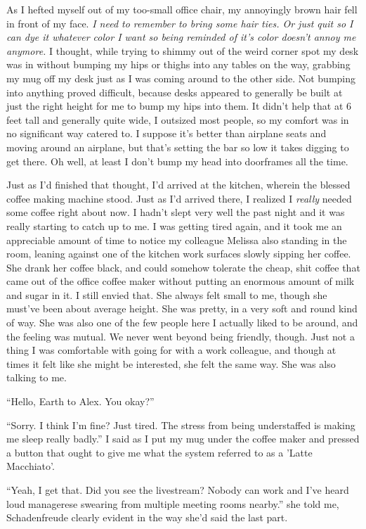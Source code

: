 As I hefted myself out of my too-small office chair, my annoyingly brown hair
fell in front of my face. \textit{I need to remember to bring some hair ties. Or
just quit so I can dye it whatever color I want so being reminded of it's color
doesn't annoy me anymore.} I thought, while trying to shimmy out of the weird
corner spot my desk was in without bumping my hips or thighs into any tables on
the way, grabbing my mug off my desk just as I was coming around to the other
side. Not bumping into anything proved difficult, because desks appeared to
generally be built at just the right height for me to bump my hips into them. It
didn't help that at 6 feet tall and generally quite wide, I outsized most
people, so my comfort was in no significant way catered to. I suppose it's
better than airplane seats and moving around an airplane, but that's setting the
bar so low it takes digging to get there. Oh well, at least I don't bump my head
into doorframes all the time.

Just as I'd finished that thought, I'd arrived at the kitchen, wherein the
blessed coffee making machine stood. Just as I'd arrived there, I realized I
\textit{really} needed some coffee right about now. I hadn't slept very well the
past night and it was really starting to catch up to me. I was getting tired
again, and it took me an appreciable amount of time to notice my colleague
Melissa also standing in the room, leaning against one of the kitchen work
surfaces slowly sipping her coffee. She drank her coffee black, and could
somehow tolerate the cheap, shit coffee that came out of the office coffee maker
without putting an enormous amount of milk and sugar in it. I still envied that.
She always felt small to me, though she must've been about average height. She
was pretty, in a very soft and round kind of way. She was also one of the few
people here I actually liked to be around, and the feeling was mutual. We never
went beyond being friendly, though. Just not a thing I was comfortable with
going for with a work colleague, and though at times it felt like she might be
interested, she felt the same way. She was also talking to me.

``Hello, Earth to Alex. You okay?''

``Sorry. I think I'm fine? Just tired. The stress from being understaffed is
making me sleep really badly.'' I said as I put my mug under the coffee maker
and pressed a button that ought to give me what the system referred to as a
'Latte Macchiato'.

``Yeah, I get that. Did you see the livestream? Nobody can work and I've heard
loud managerese swearing from multiple meeting rooms nearby.'' she told me,
Schadenfreude clearly evident in the way she'd said the last part.

